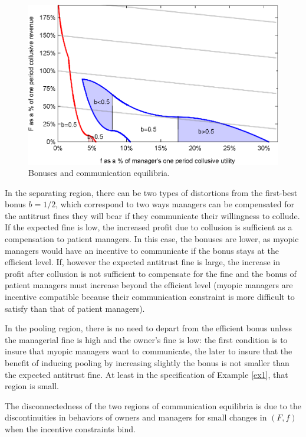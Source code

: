 \documentclass[]{article}
\begin{document}
\begin{figure}[h!]
\centering
\includegraphics[scale=0.9]{Plots/Bertrand_bonuses_f_F.eps}
\caption{Bonuses and communication equilibria.}\label{fig:cs}
\end{figure}
%
In the separating region, there can be two types of distortions from the first-best bonus $b=1/2$, which correspond to two ways managers can be compensated for the antitrust fines they will bear if they communicate their willingness to collude. If the expected fine is low, the increased profit due to collusion is sufficient as a compensation to patient managers. In this case, the bonuses are lower, as myopic managers would have an incentive to communicate if the bonus stays at the efficient level. If, however the expected antitrust fine is large, the increase in profit after collusion is not sufficient to compensate for the fine and the bonus of patient managers must increase beyond the efficient level (myopic managers are incentive compatible because their communication constraint is more difficult to satisfy than that of patient managers).

In the pooling region, there is no need to depart from the efficient bonus unless the managerial fine is high and the owner's fine is low: the first condition is to insure that myopic managers want to communicate, the later to insure that the benefit of inducing pooling by increasing slightly the bonus is not smaller than the expected antitrust fine. At least in the specification of Example \ref{ex1}, that region is small.

The disconnectedness of the two regions of communication equilibria is due to the discontinuities in behaviors of owners and managers for small changes in $(F,f)$ when the incentive constraints bind. 
\end{document}
